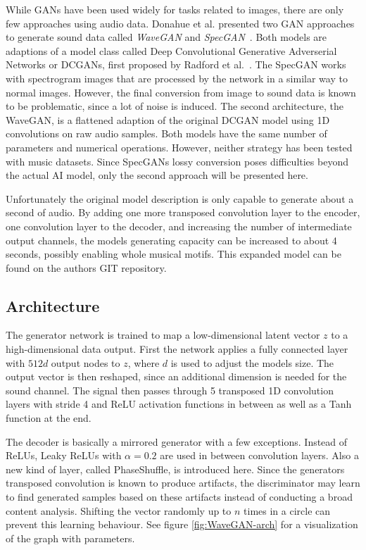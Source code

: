 \documentclass[12pt]{article}
\begin{document}
While GANs have been used widely for tasks related to images, there are only few approaches using audio data.
Donahue et al. presented two GAN approaches to generate sound data called \emph{WaveGAN} and \emph{SpecGAN}~\cite{donahue2018adversarial}.
Both models are adaptions of a model class called Deep Convolutional Generative Adverserial Networks or DCGANs, first proposed by Radford et al.~\cite{radford2015unsupervised}.
The SpecGAN works with spectrogram images that are processed by the network in a similar way to normal images.
However, the final conversion from image to sound data is known to be problematic, since a lot of noise is induced.
The second architecture, the WaveGAN, is a flattened adaption of the original DCGAN model using 1D convolutions on raw audio samples.
Both models have the same number of parameters and numerical operations.
However, neither strategy has been tested with music datasets.
Since SpecGANs lossy conversion poses difficulties beyond the actual AI model, only the second approach will be presented here.

Unfortunately the original model description is only capable to generate about a second of audio.
By adding one more transposed convolution layer to the encoder, one convolution layer to the decoder, and increasing the number of intermediate output channels, the models generating capacity can be increased to about 4 seconds, possibly
enabling whole musical motifs. 
This expanded model can be found on the authors GIT repository\cite{donahue2019wavegan}.



\subsection{Architecture}
The generator network is trained to map a low-dimensional latent vector $z$ to a high-dimensional data output.
First the network applies a fully connected layer with $512d$ output nodes to $z$, where $d$ is used to adjust the models size.
The output vector is then reshaped, since an additional dimension is needed for the sound channel.
The signal then passes through 5 transposed 1D convolution layers with stride 4 and ReLU activation functions in between as well as a Tanh function at the end.

The decoder is basically a mirrored generator with a few exceptions.
Instead of ReLUs, Leaky ReLUs with $\alpha=0.2$ are used in between convolution layers.
Also a new kind of layer, called PhaseShuffle, is introduced here. 
Since the generators transposed convolution is known to produce artifacts, the discriminator may learn to find generated samples based on these artifacts instead of conducting a broad content analysis.
Shifting the vector randomly up to $n$ times in a circle can prevent this learning behaviour.
See figure \ref{fig:WaveGAN-arch} for a visualization of the graph with parameters.
\end{document}
